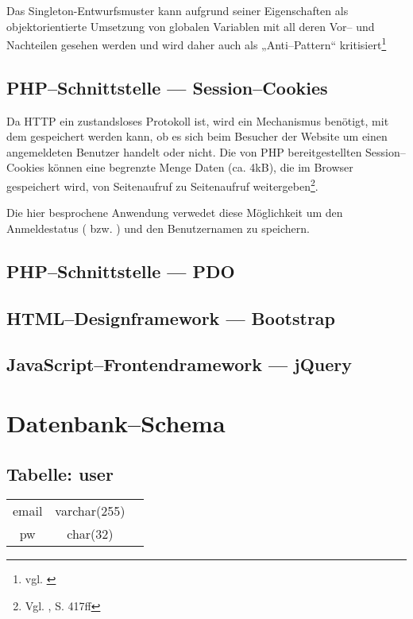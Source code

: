 Das Singleton-Entwurfsmuster kann aufgrund seiner Eigenschaften als objektorientierte Umsetzung von globalen Variablen mit all deren Vor-- und Nachteilen gesehen werden und wird daher auch als „Anti--Pattern“ kritisiert\footnote{vgl. \cite{Hauer:singleton}}

\subsection{PHP--Schnittstelle --- Session--Cookies}

Da HTTP ein zustandsloses Protokoll ist, wird ein Mechanismus benötigt, mit dem gespeichert werden kann, ob es sich beim Besucher der Website um einen angemeldeten Benutzer handelt oder nicht. Die von PHP bereitgestellten Session--Cookies können eine begrenzte Menge Daten (ca. 4kB), die im Browser gespeichert wird, von Seitenaufruf zu Seitenaufruf weitergeben\footnote{Vgl. \cite{Theis}, S. 417ff}.

Die hier besprochene Anwendung verwedet diese Möglichkeit um den Anmeldestatus ( bzw. ) und den Benutzernamen zu speichern.

\subsection{PHP--Schnittstelle --- PDO}

\subsection{HTML--Designframework --- Bootstrap}

\subsection{JavaScript--Frontendramework --- jQuery}









\section{Datenbank--Schema}

\subsection{Tabelle: user}
\begin{center}
\begin{supertabular}{c|c|c}
\hline
email & varchar(255) &  \\
pw & char(32) &  \\
\end{supertabular}
\end{center}


